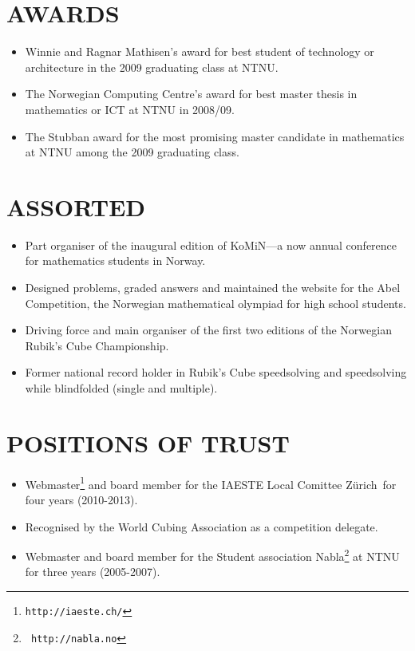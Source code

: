 \documentclass[line,margin]{res}
\newcommand{\zh}{Z\"{u}rich}
\begin{document}
\begin{resume}
\section{AWARDS}

\begin{itemize}
\item Winnie and Ragnar Mathisen's award for best student of technology
  or architecture in the 2009 graduating class at NTNU.
\item The Norwegian Computing Centre's award for best master thesis in
  mathematics or ICT at NTNU in 2008/09.
\item The Stubban award for the most promising master candidate in
  mathematics at NTNU among the 2009 graduating class.
\end{itemize}

\section{ASSORTED}

\begin{itemize}
\item Part organiser of the inaugural edition of KoMiN---a now annual conference
  for mathematics students in Norway.
\item Designed problems, graded answers and maintained the website for the Abel
  Competition, the Norwegian mathematical olympiad for high school students.
\item Driving force and main organiser of the first two editions of the
  Norwegian Rubik's Cube Championship.
\item Former national record holder in Rubik's Cube speedsolving and
  speedsolving while blindfolded (single and multiple).
\end{itemize}

\section{POSITIONS OF TRUST}

\begin{itemize}
\item Webmaster\footnote{{\tt http://iaeste.ch/}} and board member for the
  IAESTE Local Comittee \zh\ for four years (2010-2013).
\item Recognised by the World Cubing Association as a competition delegate.
\item Webmaster and board member for the Student association Nabla\footnote{{\tt
    http://nabla.no}} at NTNU for three years (2005-2007).
\end{itemize}


\end{resume}
\end{document}
